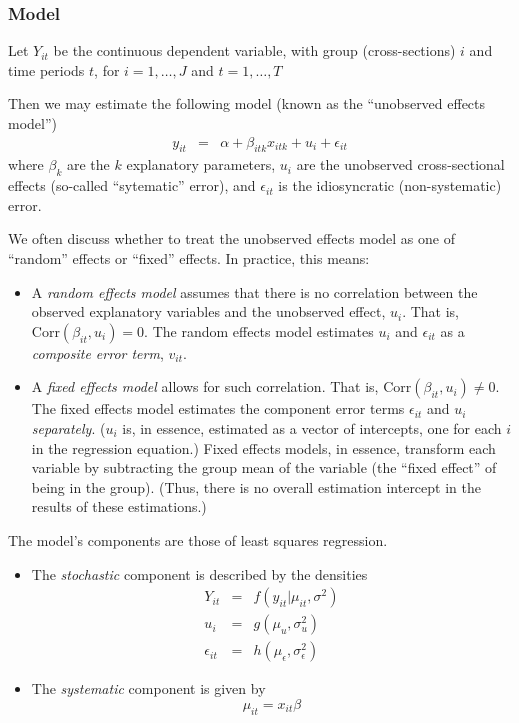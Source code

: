 \subsubsection{Model}
Let \(Y_{it}\) be the continuous dependent variable, with group (cross-sections) \(i\) and time periods \(t\), for \(i=1,\ldots,J\) and \(t=1,\ldots,T\)

Then we may estimate the following model (known as the ``unobserved effects model'')
\begin{eqnarray*}
y_{it}	&	=	&	\alpha + \beta_{itk}x_{itk} + u_i + \epsilon_{it}
\end{eqnarray*}
where \(\beta_k\) are the \(k\) explanatory parameters, \(u_i\) are the unobserved cross-sectional effects (so-called ``sytematic'' error), and \(\epsilon_{it}\) is the idiosyncratic (non-systematic) error.

We often discuss whether to treat the unobserved effects model as one of ``random'' effects or ``fixed'' effects. In practice, this means:
\begin{itemize}
\item 	A \emph{random effects model} assumes that there is no correlation between the observed explanatory variables and the unobserved effect, \(u_i\). That is, \(\mathrm{Corr}(\beta_{it},u_i) = 0\). The random effects model estimates \(u_i\) and \(\epsilon_{it}\) as a \emph{composite error term}, \(v_{it}\).
\item	A \emph{fixed effects model} allows for such correlation. That is, \(\mathrm{Corr}(\beta_{it}, u_i) \neq 0\). The fixed effects model estimates the component error terms \(\epsilon_{it}\) and \(u_i\) \emph{separately}. (\(u_i\) is, in essence, estimated as a vector of intercepts, one for each \(i\) in the regression equation.) Fixed effects models, in essence, transform each variable by subtracting the group mean of the variable (the ``fixed effect'' of being in the group). (Thus, there is no overall estimation intercept in the results of these estimations.)
\end{itemize}

The model's components are those of least squares regression.
\begin{itemize}
\item The \emph{stochastic} component is described by the densities %
\begin{eqnarray*}
Y_{it}	&	=	&	f(y_{it}|\mu_{it}, \sigma^2) \\
u_i		&	=	&	g(\mu_u, \sigma^2_u)\\
\epsilon_{it}	&	=	&	h(\mu_\epsilon, \sigma^2_\epsilon)
\end{eqnarray*}



\item The \emph{systematic} component is given by
\[\mu_{it} = x_{it}\beta\]
\end{itemize}


